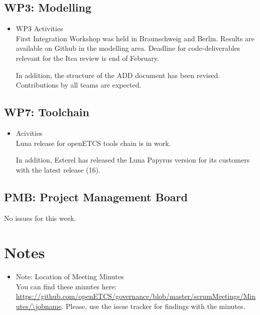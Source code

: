 \documentclass[a4paper, 11pt]{article}
\begin{document}
\subsection{WP3: Modelling}


\begin{itemize}
\item WP3 Activities\\
First Integration Workshop was held in Braunschweig and Berlin. Results are available on Github in the modelling area. Deadline for code-deliverables relevant for the Itea review is end of February. 

In addition, the structure of the ADD document has been revised. Contributions by all teams are expected.

\end{itemize}

\subsection{WP7: Toolchain}

\begin{itemize}
\item Acivities\\
Luna release for openETCS tools chain is in work. 

In addition, Esterel has released the Luna Papyrus version for its customers with the latest release (16).

\end{itemize}

\subsection{PMB: Project Management Board}
No issues for this week.

\section{Notes}
\begin{itemize}

\item Note: Location of Meeting Minutes\\
You can find these minutes here: \url{https://github.com/openETCS/governance/blob/master/scrumMeetings/Minutes/\jobname}. Please, use the issue tracker for findings with the minutes.

\end{itemize}
\end{document}
